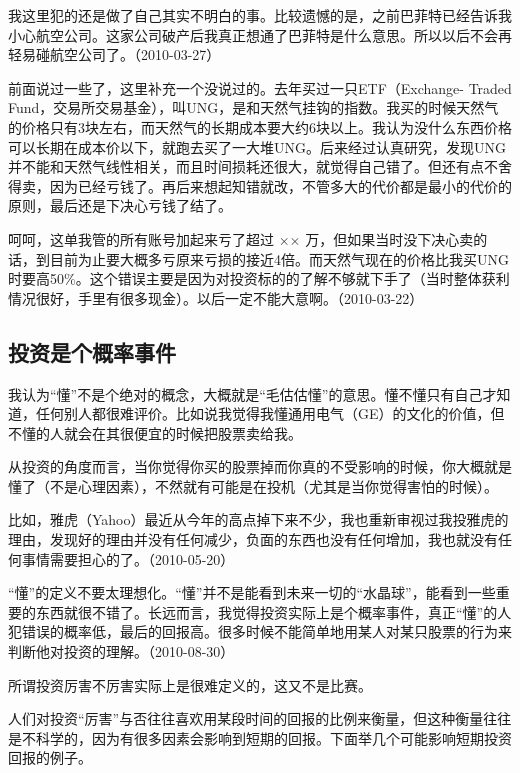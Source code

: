 我这里犯的还是做了自己其实不明白的事。比较遗憾的是，之前巴菲特已经告诉我小心航空公司。这家公司破产后我真正想通了巴菲特是什么意思。所以以后不会再轻易碰航空公司了。（2010-03-27）


前面说过一些了，这里补充一个没说过的。去年买过一只ETF（Exchange- Traded Fund，交易所交易基金），叫UNG，是和天然气挂钩的指数。我买的时候天然气的价格只有3块左右，而天然气的长期成本要大约6块以上。我认为没什么东西价格可以长期在成本价以下，就跑去买了一大堆UNG。后来经过认真研究，发现UNG并不能和天然气线性相关，而且时间损耗还很大，就觉得自己错了。但还有点不舍得卖，因为已经亏钱了。再后来想起知错就改，不管多大的代价都是最小的代价的原则，最后还是下决心亏钱了结了。

呵呵，这单我管的所有账号加起来亏了超过 \(\times\)\(\times\) 万，但如果当时没下决心卖的话，到目前为止要大概多亏原来亏损的接近4倍。而天然气现在的价格比我买UNG时要高50\%。这个错误主要是因为对投资标的的了解不够就下手了（当时整体获利情况很好，手里有很多现金）。以后一定不能大意啊。（2010-03-22）

\subsection{投资是个概率事件}

我认为“懂”不是个绝对的概念，大概就是“毛估估懂”的意思。懂不懂只有自己才知道，任何别人都很难评价。比如说我觉得我懂通用电气（GE）的文化的价值，但不懂的人就会在其很便宜的时候把股票卖给我。

从投资的角度而言，当你觉得你买的股票掉而你真的不受影响的时候，你大概就是懂了（不是心理因素），不然就有可能是在投机（尤其是当你觉得害怕的时候）。

比如，雅虎（Yahoo）最近从今年的高点掉下来不少，我也重新审视过我投雅虎的理由，发现好的理由并没有任何减少，负面的东西也没有任何增加，我也就没有任何事情需要担心的了。（2010-05-20）

“懂”的定义不要太理想化。“懂”并不是能看到未来一切的“水晶球”，能看到一些重要的东西就很不错了。长远而言，我觉得投资实际上是个概率事件，真正“懂”的人犯错误的概率低，最后的回报高。很多时候不能简单地用某人对某只股票的行为来判断他对投资的理解。（2010-08-30）

所谓投资厉害不厉害实际上是很难定义的，这又不是比赛。

人们对投资“厉害”与否往往喜欢用某段时间的回报的比例来衡量，但这种衡量往往是不科学的，因为有很多因素会影响到短期的回报。下面举几个可能影响短期投资回报的例子。

